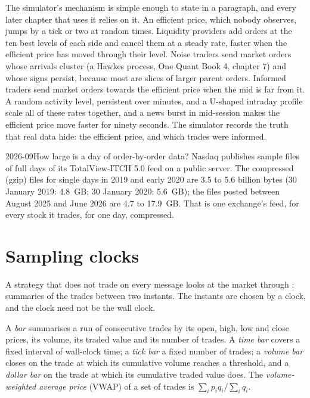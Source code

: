 The simulator's mechanism is simple enough to state in a paragraph, and every later chapter that uses it relies on it. An
efficient price, which nobody observes, jumps by a tick or two at random times. Liquidity providers add orders at the ten best
levels of each side and cancel them at a steady rate, faster when the efficient price has moved through their level. Noise
traders send market orders whose arrivals cluster (a Hawkes process, One Quant Book 4, chapter 7) and whose signs persist,
because most are slices of larger parent orders. Informed traders send market orders towards the efficient price when the
mid is far from it. A random activity level, persistent over minutes, and a U-shaped intraday profile scale all of these
rates together, and a news burst in mid-session makes the efficient price move faster for ninety seconds. The simulator
records the truth that real data hide: the efficient price, and which trades were informed.

\begin{dated}{2026-09}{How large is a day of order-by-order data?}\label{dat:rs:market-data-for-research:itch}
Nasdaq publishes sample files of full days of its TotalView-ITCH 5.0 feed on a public server. The compressed (gzip) files for
single days in 2019 and early 2020 are 3.5 to 5.6 billion bytes (30 January 2019: 4.8~GB; 30 January 2020: 5.6~GB); the
files posted between August 2025 and June 2026 are 4.7 to 17.9~GB. That is one exchange's feed, for every stock it trades, for
one day, compressed.
\end{dated}

\section{Sampling clocks}

A strategy that does not trade on every message looks at the market through : summaries of the trades between two
instants. The instants are chosen by a clock, and the clock need not be the wall clock.

\begin{definition}\label{def:rs:market-data-for-research:bar}
A \emph{bar} summarises a run of consecutive trades by its open, high, low and close prices, its volume, its traded
value and its number of trades. A \emph{time bar} covers a fixed interval of wall-clock time; a \emph{tick
bar} a fixed number of trades; a \emph{volume bar} closes on the trade at which its cumulative
volume reaches a threshold, and a \emph{dollar bar} on the trade at which its cumulative traded value does.
The \emph{volume-weighted average price} (VWAP) of a set of trades is $\sum_i p_iq_i/\sum_i q_i$.
\end{definition}

